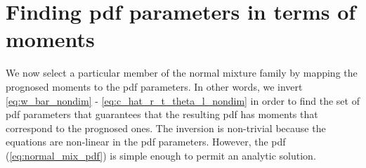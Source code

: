 \section{Finding pdf parameters in terms of moments}\label{sec:pdfparams}

We now select a particular member of the normal mixture family by mapping the prognosed moments to the \gls{pdf} parameters.
In other words, we invert \cref{eq:w_bar_nondim} - \cref{eq:c_hat_r_t_theta_l_nondim} in order to find the set of \gls{pdf} parameters that guarantees that the resulting \gls{pdf} has moments that correspond to the prognosed ones.
The inversion is non-trivial because the equations are non-linear in the \gls{pdf} parameters.
However, the \gls{pdf} (\cref{eq:normal_mix_pdf}) is simple enough to permit an analytic solution.

